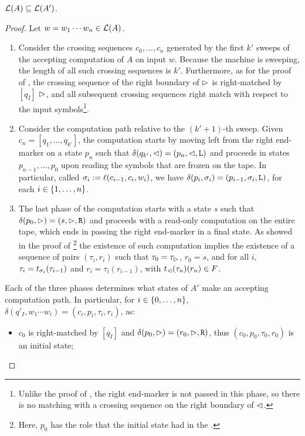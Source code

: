 \begin{lemm}\label{lem:swkLAtoNFA-1}
	$\mathcal L(A)\subseteq\mathcal L(A')$.
\end{lemm}
\begin{proof}
	Let $w=w_1\cdots w_n\in\mathcal L(A)$.
	\begin{enumerate}
		\item Consider the crossing sequences $c_0,\dots,c_n$ generated by the first $k'$ sweeps of the accepting computation of $A$ on input $w$.
		      Because the machine is sweeping, the length of all such crossing sequences is $k'$.
		      Furthermore, as for the proof of , the crossing sequence of the right boundary of $\rhd$ is right-matched by $[q_I]$ \wrt $\rhd$, and all subsequent crossing sequences right match with respect to the input symbols\footnote{%
			      Unlike the proof of , the right end-marker is not passed in this phase, so there is no matching with a crossing sequence on the right boundary of $\lhd$.}.
		\item Consider the computation path relative to the $(k'+1)$-th sweep.
		      Given $c_n=[q_1,\dots,q_{k'}]$, the computation starts by moving left from the right end-marker on a state $p_n$ such that $\delta(q_{k'},\lhd)=(p_n,\lhd,\mathtt L)$ and proceeds in states $p_{n-1},\dots,p_0$ upon reading the symbols that are frozen on the tape.
		      In particular, called $\sigma_i:=\ell(c_{i-1},c_i,w_i)$, we have $\delta(p_i,\sigma_i)=(p_{i-1},\sigma_i,\mathtt L)$, for each $i\in\{1,\dots,n\}$.
		\item The last phase of the computation starts with a state $s$ such that $\delta(p_0,\rhd)=(s,\rhd,\mathtt R)$ and proceeds with a read-only computation on the entire tape, which ends in passing the right end-marker in a final state.
		      As showed in the proof of \footnote{%
			      Here, $p_0$ has the role that the initial state had in the \TDFA.}
		      the existence of such computation implies the existence of a sequence of pairs $(\tau_i,r_i)$ such that $\tau_0=\tau_\rhd$, $r_0=s$, and for all $i$, $\tau_i=t_{\sigma_i}(\tau_{i-1})$ and $r_i=\tau_i(r_{i-1})$, with $t_\lhd(\tau_n)(r_n)\in F$.
	\end{enumerate}
	Each of the three phases determines what states of $A'$ make an accepting computation path. In particular, for $i\in\{0,\dots,n\}$, $\delta(q'_I,w_1\cdots w_i)=(c_i,p_i,\tau_i,r_i)$, as:
	\begin{itemize}
		\item $c_0$ is right-matched by $[q_I]$ and $\delta(p_0,\rhd)=(r_0,\rhd,\mathtt R)$, thus $(c_0,p_0,\tau_0,r_0)$ is an initial state;

\end{itemize}
\end{proof}
